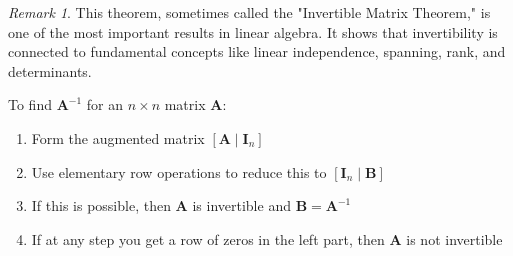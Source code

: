\documentclass[12pt]{article}
\numberwithin{equation}{section}
\newcommand{\mat}[1]{\mathbf{#1}}        %
\theoremstyle{plain}
\theoremstyle{definition}
\theoremstyle{remark}
\newtheorem{remark}[theorem]{Remark}
\begin{document}
\begin{remark}
This theorem, sometimes called the "Invertible Matrix Theorem," is one of the most important results in linear algebra. It shows that invertibility is connected to fundamental concepts like linear independence, spanning, rank, and determinants.
\end{remark}

\begin{algorithm}[H]
\caption{Finding Matrix Inverse via Row Reduction}
To find $\mat{A}^{-1}$ for an $n \times n$ matrix $\mat{A}$:
\begin{enumerate}
\item Form the augmented matrix $[\mat{A} \mid \mat{I}_n]$
\item Use elementary row operations to reduce this to $[\mat{I}_n \mid \mat{B}]$
\item If this is possible, then $\mat{A}$ is invertible and $\mat{B} = \mat{A}^{-1}$
\item If at any step you get a row of zeros in the left part, then $\mat{A}$ is not invertible
\end{enumerate}
\end{algorithm}
\end{document}
